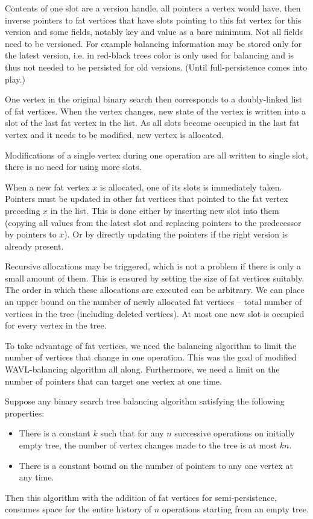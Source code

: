 Contents of one slot are a version handle, all pointers a vertex would have, then inverse pointers to fat vertices that have slots pointing to this fat vertex for this version and some fields, notably key and value as a bare minimum.
Not all fields need to be versioned. 
For example balancing information may be stored only for the latest version, i.e. in red-black trees color is only used for balancing and is thus not needed to be persisted for old versions. 
(Until full-persistence comes into play.)

One vertex in the original binary search then corresponds to a doubly-linked list of fat vertices.
When the vertex changes, new state of the vertex is written into a slot of the last fat vertex in the list. 
As all slots become occupied in the last fat vertex and it needs to be modified, new vertex is allocated.

Modifications of a single vertex during one operation are all written to single slot, there is no need for using more slots.

When a new fat vertex $x$ is allocated, one of its slots is immediately taken. 
Pointers must be updated in other fat vertices that pointed to the fat vertex preceding $x$ in the list. 
This is done either by inserting new slot into them (copying all values from the latest slot and replacing pointers to the predecessor by pointers to $x$). 
Or by directly updating the pointers if the right version is already present. 

Recursive allocations may be triggered, which is not a problem if there is only a small amount of them. 
This is ensured by setting the size of fat vertices suitably. 
The order in which these allocations are executed can be arbitrary.
We can place an upper bound on the number of newly allocated fat vertices -- total number of vertices in the tree (including deleted vertices). 
At most one new slot is occupied for every vertex in the tree.

To take advantage of fat vertices, we need the balancing algorithm to limit the number of vertices that change in one operation. 
This was the goal of modified WAVL-balancing algorithm all along. 
Furthermore, we need a limit on the number of pointers that can target one vertex at one time.

\begin{prop}
Suppose any binary search tree balancing algorithm satisfying the following properties:
\begin{itemize}
\item 
There is a constant $k$ such that for any $n$ successive operations on initially empty tree, the number of vertex changes made to the tree is at most $kn$. 
\item 
There is a constant bound on the number of pointers to any one vertex at any time.
\end{itemize}
Then this algorithm with the addition of fat vertices for semi-persistence, consumes  space for the entire history of $n$ operations starting from an empty tree.
\end{prop}

